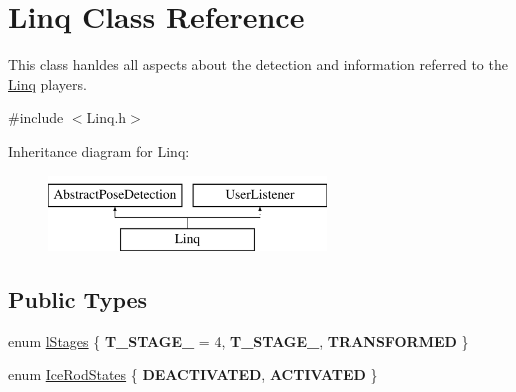 \hypertarget{classLinq}{
\section{Linq Class Reference}
\label{classLinq}
}


This class hanldes all aspects about the detection and information referred to the \hyperlink{classLinq}{Linq} players.  




{\ttfamily \#include $<$Linq.h$>$}

Inheritance diagram for Linq:\begin{figure}[H]
\begin{center}
\leavevmode
\includegraphics[height=2cm]{classLinq}
\end{center}
\end{figure}
\subsection*{Public Types}
\begin{DoxyCompactItemize}
\item 
enum \hyperlink{classLinq_a63d00f6589f33af65604d363574fbe51}{lStages} \{ {\bfseries T\_\-STAGE\_} =  4, 
{\bfseries T\_\-STAGE\_}, 
{\bfseries TRANSFORMED}
 \}
\item 
enum \hyperlink{classLinq_a40047098b8a09b8eb59b005a07c9671b}{IceRodStates} \{ {\bfseries DEACTIVATED}, 
{\bfseries ACTIVATED}
 \}
\end{DoxyCompactItemize}
